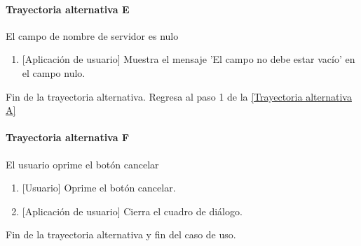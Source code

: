 \paragraph{Trayectoria alternativa E} \label{SUB-U-CU1.9:TE}
    El campo de nombre de servidor es nulo
    \begin{enumerate}[label=D\arabic*.]
		\item {[Aplicación de usuario]} Muestra el mensaje 'El campo no debe estar vacío' en el campo nulo.
	\end{enumerate}
	Fin de la trayectoria alternativa. Regresa al paso 1 de la \hyperref[SUB-U-CU1.9:TA]{[Trayectoria alternativa A]}
	
\paragraph{Trayectoria alternativa F} \label{SUB-U-CU1.9:TF}
    El usuario oprime el botón cancelar
    \begin{enumerate}[label=D\arabic*.]
		\item {[Usuario]} Oprime el botón cancelar.
		\item {[Aplicación de usuario]} Cierra el cuadro de diálogo.
	\end{enumerate}
	Fin de la trayectoria alternativa y fin del caso de uso.